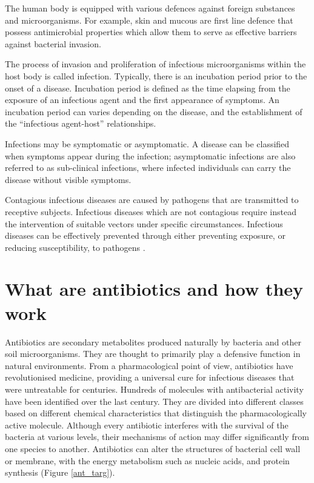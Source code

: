 \documentclass[11pt]{report}
\begin{document}
The human body is equipped with various defences against foreign substances and microorganisms. For example, skin and mucous are first line defence that possess antimicrobial properties which allow them to serve as effective barriers against bacterial invasion.

The process of invasion and proliferation of infectious microorganisms within the host body is called infection. Typically, there is an incubation period prior to the onset of a disease. Incubation period is defined as the time elapsing from the exposure of an infectious agent and the first appearance of symptoms. An incubation period can varies depending on the disease, and the establishment of the “infectious agent-host” relationships.

Infections may be symptomatic or asymptomatic. A disease can be classified when symptoms appear during the infection; asymptomatic infections are also referred to as sub-clinical infections, where infected individuals can carry the disease without visible symptoms.

Contagious infectious diseases are caused by pathogens that are transmitted to receptive subjects.
Infectious diseases which are not contagious require instead the intervention of suitable vectors under specific circumstances.
Infectious diseases can be effectively prevented through either preventing exposure, or reducing susceptibility, to pathogens \cite{EPICentro}.

\chapter{What are antibiotics and how they work}
Antibiotics are secondary metabolites produced naturally by bacteria and other soil microorganisms.
They are thought to primarily play a defensive function in natural environments.
From a pharmacological point of view, antibiotics have revolutionised medicine, providing a universal cure for infectious diseases that were untreatable for centuries.
Hundreds of molecules with antibacterial activity have been identified over the last century. They are divided into different classes based on different chemical characteristics that distinguish the pharmacologically active molecule.
Although every antibiotic interferes with the survival of the bacteria at various levels, their mechanisms of action may differ significantly from one species to another.
Antibiotics can alter the structures of bacterial cell wall or membrane, with the energy metabolism such as nucleic acids, and protein synthesis (Figure \ref{ant_targ}).
\end{document}
